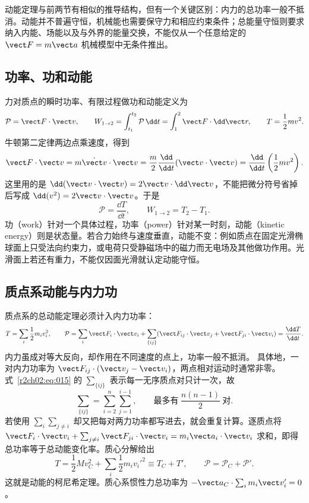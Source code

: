 动能定理与前两节有相似的推导结构，但有一个关键区别：内力的总功率一般不抵消。动能并不普遍守恒，机械能也需要保守力和相应约束条件；总能量守恒则要求纳入内能、场能以及与外界的能量交换，不能仅从一个任意给定的 $\vect F=m\vect a$ 机械模型中无条件推出。

\subsection{功率、功和动能}
\label{r2ch02:sec:point-energy}

力对质点的瞬时功率、有限过程做功和动能定义为
\begin{equation}
 \mathcal P=\vect F\cdot\vect v,\qquad
 W_{1\to2}=\int_{t_1}^{t_2}\mathcal P\,\dd t
 =\int_{1}^{2}\vect F\cdot\dd\vect r,\qquad
 T=\frac12mv^2.
 \label{r2ch02:eq:013}
\end{equation}
牛顿第二定律两边点乘速度，得到
\[
 \vect F\cdot\vect v
 =m\dot{\vect v}\cdot\vect v
 =\frac m2\frac{\dd}{\dd t}(\vect v\cdot\vect v)
 =\frac{\dd}{\dd t}\left(\frac12mv^2\right).
\]
这里用的是 $\dd(\vect v\cdot\vect v)=2\vect v\cdot\dd\vect v$，不能把微分符号省掉后写成 $\dd(v^2)=2\vect v\cdot\vect v$。于是
\begin{equation}
 \boxed{\mathcal P=\frac{\dd T}{\dd t}},
 \qquad W_{1\to2}=T_2-T_1.
 \label{r2ch02:eq:014}
\end{equation}
功（work）针对一个具体过程，功率（power）针对某一时刻，动能（kinetic energy）则是状态量。若合力始终与速度垂直，动能不变：例如质点在固定光滑椭球面上只受法向约束力，或电荷只受静磁场中的磁力而无电场及其他做功作用。光滑面上若还有重力，不能仅因面光滑就认定动能守恒。

\subsection{质点系动能与内力功}
\label{r2ch02:sec:system-kinetic}

质点系的总动能定理必须计入内力功率：
\begin{equation}
 T=\sum_i\frac12m_iv_i^2,\qquad
 \mathcal P=\sum_i\vect F_i\cdot\vect v_i
 +\sum_{\{ij\}}(\vect F_{ij}\cdot\vect v_j+\vect F_{ji}\cdot\vect v_i)
 =\frac{\dd T}{\dd t}.
 \label{r2ch02:eq:015}
\end{equation}
内力虽成对等大反向，却作用在不同速度的点上，功率一般不抵消。
具体地，一对内力功率为 $\vect F_{ij}\cdot(\vect v_j-\vect v_i)$，两点相对运动时通常非零。式~\eqref{r2ch02:eq:015} 的 $\sum_{\{ij\}}$ 表示每一无序质点对只计一次，故
\[
 \sum_{\{ij\}}=\sum_{i=2}^{n}\sum_{j=1}^{i-1},
 \qquad \text{最多有}\ \frac{n(n-1)}2\ \text{对}.
\]
若使用 $\sum_i\sum_{j\ne i}$ 却又把每对两力功率都写进去，就会重复计算。逐质点将
$\vect F_i\cdot\vect v_i+\sum_{j\ne i}\vect F_{ji}\cdot\vect v_i=m_i\vect a_i\cdot\vect v_i$
求和，即得总功率等于总动能变化率。质心分解给出
\begin{equation}
 T=\frac12Mv_C^2+\sum_i\frac12m_iv_i'^2\equiv T_C+T',
 \qquad \mathcal P=\mathcal P_C+\mathcal P'.
 \label{r2ch02:eq:016}
\end{equation}
这就是动能的柯尼希定理。质心系惯性力总功率为
$-\vect a_C\cdot\sum_i m_i\vect v_i'=0$。

